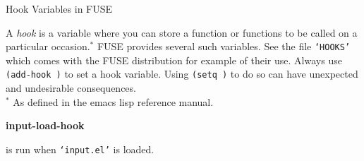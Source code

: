 \documentclass[twocolumn]{article}
\newenvironment{Boxedminipage}%
{\begin{Sbox}\begin{minipage}}%
  {\end{minipage}\end{Sbox}\Ovalbox{\TheSbox}}
\def\FUSE{{\textsf{FUSE}}}
\def\file#1{{\texttt{`#1'}}}
\begin{document}



\vspace{1truecm}

\begin{center}
  \begin{Boxedminipage}{0.75\linewidth}
    \begin{center}
      {\large Hook Variables in {\FUSE}}
    \end{center}
  \end{Boxedminipage}
\end{center}

A \emph{hook} is a variable where you can store a function or
functions to be called on a particular occasion.$^\ast$ {\FUSE}
provides several such variables.  See the file \file{HOOKS} which
comes with the {\FUSE} distribution for example of their use.  Always
use \hbox{\texttt{(add-hook )}} to set a hook variable.  Using
\hbox{\texttt{(setq )}} to do so can have unexpected and undesirable
consequences. \\\hfill \hfill {\scriptsize $^\ast$ As defined in the
  emacs lisp reference manual.}

\vspace{0.5truecm}


\def\hookv#1#2{{
    \begin{flushright}
      \begin{minipage}[h]{0.97\linewidth}
        \vspace{-0.15truecm}
        \textbf{#1}\hfill
        \begin{flushright}
          \begin{minipage}[h]{0.93\linewidth}
            \vspace{-0.2truecm}
             is run when #2
          \end{minipage}
        \end{flushright}
      \end{minipage}
    \end{flushright}
    }}

\hookv{input-load-hook}{\file{input.el} is loaded.}
\end{document}
